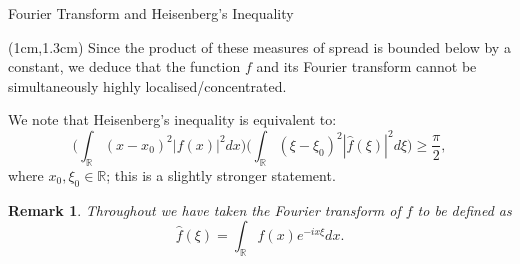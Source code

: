\documentclass{beamer}
\newtheorem*{remark}{Remark}
\begin{document}
\begin{frame}{Fourier Transform and Heisenberg's Inequality}
\begin{textblock*}{11cm}(1cm,1.3cm)
Since the product of these measures of spread is bounded below by a constant, we deduce that the function $f$ and its Fourier transform cannot be simultaneously 
highly localised/concentrated.


\begin{block}{}
We note that Heisenberg's inequality is equivalent to:
$$\Bigg(\int_{\mathbb{R}}(x-x_{0})^{2}|f(x)|^{2}dx\Bigg)\Bigg(\int_{\mathbb{R}}(\xi-\xi_{0})^{2}|\hat{f}(\xi)|^{2}d\xi\Bigg) \geq \frac{\pi}{2},$$
where $x_{0},\xi_{0}\in\mathbb{R}$; this is a slightly stronger statement.
\end{block}

\begin{remark}
Throughout we have taken the Fourier transform of $f$ to be defined as 
$$\hat{f}(\xi)=\int_{\mathbb{R}}f(x)e^{-ix\xi}dx.$$
\end{remark}

\end{textblock*}
\end{frame}
\end{document}
